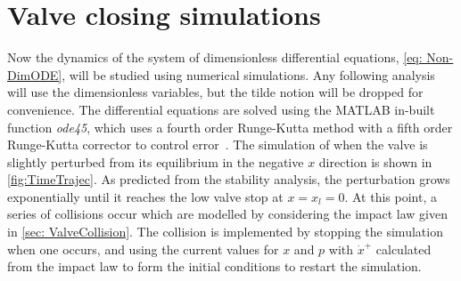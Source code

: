 \section{Valve closing simulations} \label{sec: ClosingSimulation}

Now the dynamics of the system of dimensionless differential equations, \cref{eq: Non-DimODE}, will be studied using numerical simulations. Any following analysis will use the dimensionless variables, but the tilde notion will be dropped for convenience. The differential equations are solved using the MATLAB in-built function \textit{ode45}, which uses a fourth order Runge-Kutta method with a fifth order Runge-Kutta corrector to control error~\cite{Shampine1997TheSuite}. The simulation of when the valve is slightly perturbed from its equilibrium in the negative $x$ direction is shown in \cref{fig:TimeTrajec}. As predicted from the stability analysis, the perturbation grows exponentially until it reaches the low valve stop at $x = x_l = 0$. At this point, a series of collisions occur which are modelled by considering the impact law given in \cref{sec: ValveCollision}. The collision is implemented by stopping the simulation when one occurs, and using the current values for $x$ and $p$ with $\dot{x}^+$ calculated from the impact law to form the initial conditions to restart the simulation.
~
